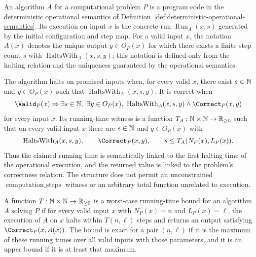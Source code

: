 \begin{definition}
  \label{def:problem-algorithm}
  An algorithm $A$ for a computational problem $P$ is a program code in the
  deterministic operational semantics of
  Definition~\ref{def:deterministic-operational-semantics}.  Its execution on
  input $x$ is the concrete run $\operatorname{Run}_A(x,s)$ generated by the
  initial configuration and step map.  For a valid input $x$, the notation
  $A(x)$ denotes the unique output $y\in O_P(x)$ for which there exists a
  finite step count $s$ with $\operatorname{HaltsWith}_A(x,s,y)$; this notation
  is defined only from the halting relation and the uniqueness guaranteed by
  the operational semantics.

  The algorithm halts on promised inputs when, for every valid $x$, there
  exist $s\in\mathbb{N}$ and $y\in O_P(x)$ such that
  $\operatorname{HaltsWith}_A(x,s,y)$.  It is correct when
  \[
    \Valid_P(x)\Rightarrow
    \exists s\in\N,\ \exists y\in O_P(x),\
      \operatorname{HaltsWith}_A(x,s,y)\wedge \Correct_P(x,y)
  \]
  for every input $x$.  Its running-time witness is a function
  $T_A:\mathbb{N}\times\mathbb{N}\to\mathbb{R}_{\geq0}$ such that on every valid input $x$ there are
  $s\in\mathbb{N}$ and $y\in O_P(x)$ with
  \[
    \operatorname{HaltsWith}_A(x,s,y),\qquad
    \Correct_P(x,y),\qquad
    s\leq T_A(N_P(x),L_P(x)).
  \]
  Thus the claimed running time is semantically linked to the first halting
  time of the operational execution, and the returned value is linked to the
  problem's correctness relation.  The structure does not permit an
  unconstrained $\operatorname{computation\_steps}$ witness or an arbitrary
  total function unrelated to execution.
\end{definition}

\begin{definition}
  \label{def:exact-worst-case-running-time}
  A function $T:\mathbb{N}\times\mathbb{N}\to\mathbb{R}_{\geq0}$ is a worst-case running-time bound for
  an algorithm $A$ solving $P$ if for every valid input $x$ with
  $N_P(x)=n$ and $L_P(x)=\ell$, the execution of $A$ on $x$ halts within
  $T(n,\ell)$ steps and returns an output satisfying $\Correct_P(x,A(x))$.
  The bound is exact for a pair $(n,\ell)$ if it is the maximum of these
  running times over all valid inputs with those parameters, and it is an upper
  bound if it is at least that maximum.
\end{definition}

